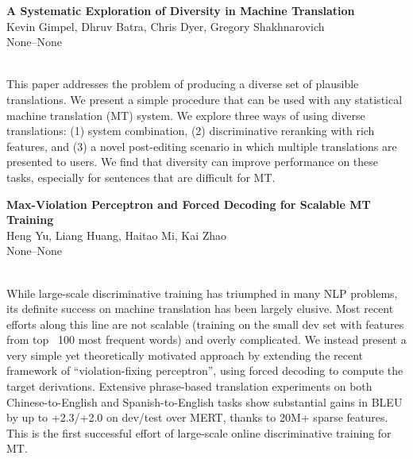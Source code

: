 \documentclass[twoside,makeidx]{book}
\begin{document}
\par\vspace{2em}\noindent%
\begin{minipage}{\linewidth}%
\begin{center}
\textbf{\normalsize A Systematic Exploration of Diversity in Machine Translation}\\
\normalsize  Kevin Gimpel,  Dhruv Batra,  Chris Dyer,  Gregory Shakhnarovich\\
{\small None--None}\\
\end{center}
\end{minipage}\\[0.5em]
\nopagebreak%
\noindent%
{\small This paper addresses the problem of producing a diverse set of plausible translations. We present a simple procedure that can be used with any statistical machine translation (MT) system. We explore three ways of using diverse translations: (1) system combination, (2) discriminative reranking with rich features, and (3) a novel post-editing scenario in which multiple translations are presented to users. We find that diversity can improve performance on these tasks, especially for sentences that are difficult for MT.}
\par\vspace{2em}\noindent%
\begin{minipage}{\linewidth}%
\begin{center}
\textbf{\normalsize Max-Violation Perceptron and Forced Decoding for Scalable MT Training}\\
\normalsize  Heng Yu,  Liang Huang,  Haitao Mi,  Kai Zhao\\
{\small None--None}\\
\end{center}
\end{minipage}\\[0.5em]
\nopagebreak%
\noindent%
{\small While large-scale discriminative training has triumphed in many NLP problems, its definite success on machine translation has been largely elusive. Most recent efforts along this line are not scalable (training on the small dev set with features from top ~100 most frequent words) and overly complicated. We instead present a very simple yet theoretically motivated approach by extending the recent framework of ``violation-fixing perceptron'', using forced decoding to compute the target derivations. Extensive phrase-based translation experiments on both Chinese-to-English and Spanish-to-English tasks show substantial gains in BLEU by up to +2.3/+2.0 on dev/test over MERT, thanks to 20M+ sparse features. This is the first successful effort of large-scale online discriminative training for MT.}
\end{document}
